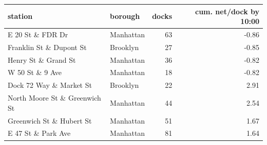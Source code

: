 \begin{tabular}{llrr}
\toprule
\textbf{station} & \textbf{borough} & \textbf{docks} & \textbf{cum. net/dock by 10:00} \\
\midrule
E 20 St \& FDR Dr & Manhattan & 63 & -0.86 \\
Franklin St \& Dupont St & Brooklyn & 27 & -0.85 \\
Henry St \& Grand St & Manhattan & 36 & -0.82 \\
W 50 St \& 9 Ave & Manhattan & 18 & -0.82 \\
Dock 72 Way \& Market St & Brooklyn & 22 & 2.91 \\
North Moore St \& Greenwich St & Manhattan & 44 & 2.54 \\
Greenwich St \& Hubert St & Manhattan & 51 & 1.67 \\
E 47 St \& Park Ave & Manhattan & 81 & 1.64 \\
\bottomrule
\end{tabular}
